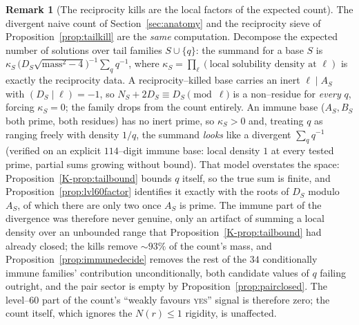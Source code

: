 \documentclass[11pt]{article}
\theoremstyle{definition}
\newtheorem{remark}[theorem]{Remark}
\begin{document}
\begin{remark}[The reciprocity kills are the local factors of the expected count]\label{rem:killcount}
The divergent naive count of Section~\ref{sec:anatomy} and the reciprocity sieve of
Proposition~\ref{prop:tailkill} are the \emph{same} computation. Decompose the expected number of
solutions over tail families $S\cup\{q\}$: the summand for a base $S$ is
$\kappa_S\,\bigl(D_S\sqrt{\mathrm{mass}^2-4}\bigr)^{-1}\sum_q q^{-1}$, where
$\kappa_S=\prod_\ell(\text{local solubility density at }\ell)$ is exactly the reciprocity data.
A reciprocity--killed base carries an inert $\ell\mid A_S$ with $(D_S\mid\ell)=-1$, so
$N_S+2D_S\equiv D_S\pmod\ell$ is a non--residue for \emph{every} $q$, forcing $\kappa_S=0$; the
family drops from the count entirely. An immune base ($A_S,B_S$ both prime, both residues) has no
inert prime, so $\kappa_S>0$ and, treating $q$ as ranging freely with density $1/q$, the summand
\emph{looks} like a divergent $\sum_q q^{-1}$ (verified on an explicit $114$--digit immune base: local
density $1$ at every tested prime, partial sums growing without bound). That model overstates the
space: Proposition~\ref{K-prop:tailbound} bounds $q$ itself, so the true sum is finite, and
Proposition~\ref{prop:lvl60factor} identifies it exactly with the roots of $D_S$ modulo $A_S$, of which
there are only two once $A_S$ is prime. The immune part of the divergence was therefore never genuine,
only an artifact of summing a local density over an unbounded range that
Proposition~\ref{K-prop:tailbound} had already closed; the kills remove ${\sim}93\%$ of the count's mass,
and Proposition~\ref{prop:immunedecide} removes the rest of the $34$ conditionally immune families'
contribution unconditionally, both candidate values of $q$ failing outright, and the pair sector is empty by
Proposition~\ref{prop:pairclosed}. The level--$60$ part of the count's ``weakly favours \textsc{yes}'' signal is therefore
zero; the count itself, which ignores the $N(r)\le1$ rigidity, is unaffected.
\end{remark}
\end{document}
